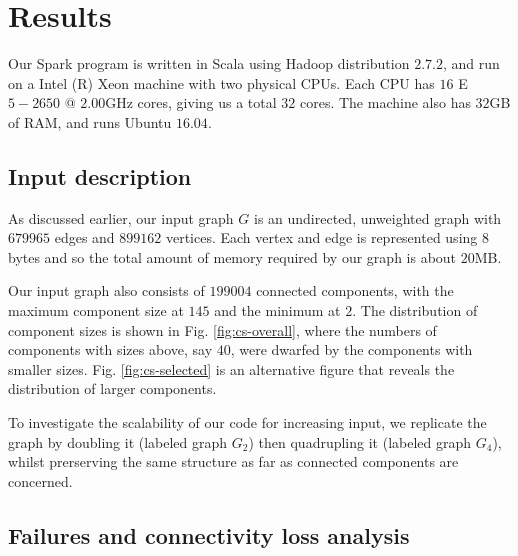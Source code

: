 \section{Results}
\label{results}

Our Spark program is written in Scala using Hadoop distribution $2.7.2$, and run on a Intel (R) Xeon machine with two physical CPUs. Each CPU has $16$ E$5-2650$ @ $2.00$GHz cores, giving us a total $32$ cores. The machine also has $32$GB of RAM, and runs Ubuntu $16.04$.  

\subsection{Input description}

As discussed earlier, our input graph $G$ is an undirected, unweighted graph with $679965$ edges and $899162$ vertices. Each vertex and edge is represented using 8 bytes and so the total amount of memory required by our graph is about $20$MB. 

Our input graph also consists of $199004$ connected components, with the maximum component size at $145$ and the minimum at $2$. The distribution of component sizes is shown in Fig. \ref{fig:cs-overall}, where the numbers of components with sizes above, say $40$, were dwarfed by the components with smaller sizes. Fig. \ref{fig:cs-selected} is an alternative figure that reveals the distribution of larger components. 

To investigate the scalability of our code for increasing input, we replicate the graph by doubling it (labeled graph $G_2$) then quadrupling it (labeled graph $G_4$), whilst prerserving the same structure as far as connected components are concerned.

\subsection{Failures and connectivity loss analysis}

